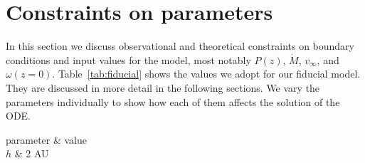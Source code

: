\section{Constraints on parameters}
\label{sect:parameters}
In this section we discuss observational and theoretical constraints on boundary conditions and input values for the model, most notably $P(z)$, $\dot M$, $v_\infty$, and $\omega(z=0)$. Table~\ref{tab:fiducial} shows the values we adopt for our fiducial model. They are discussed in more detail in the following sections. We vary the parameters individually to show how each of them affects the solution of the ODE. 
\begin{table}
\begin{tabular}[cc]
parameter & value\\
$h$ & 2 AU\\
\end{tabular}
\end{table}